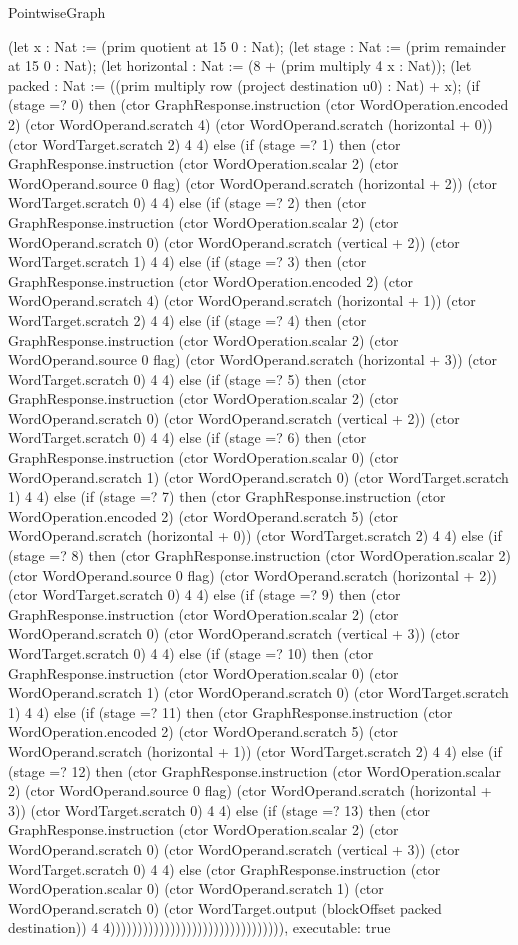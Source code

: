 \begin{lexlean}{PointwiseGraph}
\begin{semanticmodule}
{      (let x : Nat := (prim quotient at 15 0 : Nat);
      (let stage : Nat := (prim remainder at 15 0 : Nat);
      (let horizontal : Nat := (8 + (prim multiply 4 x : Nat));
      (let packed : Nat := ((prim multiply row (project destination u0) : Nat) + x);
      (if (stage =? 0) then (ctor GraphResponse.instruction (ctor WordOperation.encoded 2) (ctor WordOperand.scratch 4) (ctor WordOperand.scratch (horizontal + 0)) (ctor WordTarget.scratch 2) 4 4) else (if (stage =? 1) then (ctor GraphResponse.instruction (ctor WordOperation.scalar 2) (ctor WordOperand.source 0 flag) (ctor WordOperand.scratch (horizontal + 2)) (ctor WordTarget.scratch 0) 4 4) else (if (stage =? 2) then (ctor GraphResponse.instruction (ctor WordOperation.scalar 2) (ctor WordOperand.scratch 0) (ctor WordOperand.scratch (vertical + 2)) (ctor WordTarget.scratch 1) 4 4) else (if (stage =? 3) then (ctor GraphResponse.instruction (ctor WordOperation.encoded 2) (ctor WordOperand.scratch 4) (ctor WordOperand.scratch (horizontal + 1)) (ctor WordTarget.scratch 2) 4 4) else (if (stage =? 4) then (ctor GraphResponse.instruction (ctor WordOperation.scalar 2) (ctor WordOperand.source 0 flag) (ctor WordOperand.scratch (horizontal + 3)) (ctor WordTarget.scratch 0) 4 4) else (if (stage =? 5) then (ctor GraphResponse.instruction (ctor WordOperation.scalar 2) (ctor WordOperand.scratch 0) (ctor WordOperand.scratch (vertical + 2)) (ctor WordTarget.scratch 0) 4 4) else (if (stage =? 6) then (ctor GraphResponse.instruction (ctor WordOperation.scalar 0) (ctor WordOperand.scratch 1) (ctor WordOperand.scratch 0) (ctor WordTarget.scratch 1) 4 4) else (if (stage =? 7) then (ctor GraphResponse.instruction (ctor WordOperation.encoded 2) (ctor WordOperand.scratch 5) (ctor WordOperand.scratch (horizontal + 0)) (ctor WordTarget.scratch 2) 4 4) else (if (stage =? 8) then (ctor GraphResponse.instruction (ctor WordOperation.scalar 2) (ctor WordOperand.source 0 flag) (ctor WordOperand.scratch (horizontal + 2)) (ctor WordTarget.scratch 0) 4 4) else (if (stage =? 9) then (ctor GraphResponse.instruction (ctor WordOperation.scalar 2) (ctor WordOperand.scratch 0) (ctor WordOperand.scratch (vertical + 3)) (ctor WordTarget.scratch 0) 4 4) else (if (stage =? 10) then (ctor GraphResponse.instruction (ctor WordOperation.scalar 0) (ctor WordOperand.scratch 1) (ctor WordOperand.scratch 0) (ctor WordTarget.scratch 1) 4 4) else (if (stage =? 11) then (ctor GraphResponse.instruction (ctor WordOperation.encoded 2) (ctor WordOperand.scratch 5) (ctor WordOperand.scratch (horizontal + 1)) (ctor WordTarget.scratch 2) 4 4) else (if (stage =? 12) then (ctor GraphResponse.instruction (ctor WordOperation.scalar 2) (ctor WordOperand.source 0 flag) (ctor WordOperand.scratch (horizontal + 3)) (ctor WordTarget.scratch 0) 4 4) else (if (stage =? 13) then (ctor GraphResponse.instruction (ctor WordOperation.scalar 2) (ctor WordOperand.scratch 0) (ctor WordOperand.scratch (vertical + 3)) (ctor WordTarget.scratch 0) 4 4) else (ctor GraphResponse.instruction (ctor WordOperation.scalar 0) (ctor WordOperand.scratch 1) (ctor WordOperand.scratch 0) (ctor WordTarget.output (blockOffset packed destination)) 4 4)))))))))))))))))))))))))))))))),
  executable: true
}


\end{semanticmodule}
\end{lexlean}
